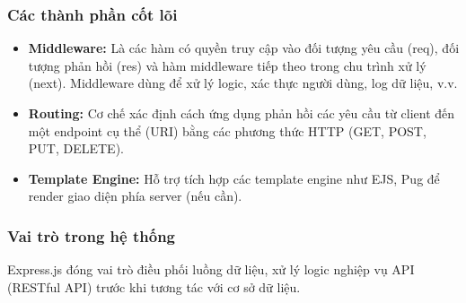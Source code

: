 \subsubsection{Các thành phần cốt lõi}
\begin{itemize}
    \item \textbf{Middleware:} Là các hàm có quyền truy cập vào đối tượng yêu cầu (req), đối tượng phản hồi (res) và hàm middleware tiếp theo trong chu trình xử lý (next). Middleware dùng để xử lý logic, xác thực người dùng, log dữ liệu, v.v.
    \item \textbf{Routing:} Cơ chế xác định cách ứng dụng phản hồi các yêu cầu từ client đến một endpoint cụ thể (URI) bằng các phương thức HTTP (GET, POST, PUT, DELETE).
    \item \textbf{Template Engine:} Hỗ trợ tích hợp các template engine như EJS, Pug để render giao diện phía server (nếu cần).
\end{itemize}

\subsubsection{Vai trò trong hệ thống}
Express.js đóng vai trò điều phối luồng dữ liệu, xử lý logic nghiệp vụ API (RESTful API) trước khi tương tác với cơ sở dữ liệu.


